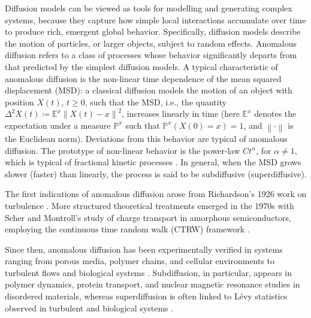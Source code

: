\documentclass[reqno]{amsart}
\theoremstyle{remark}
\numberwithin{equation}{section} %
\newcommand{\PP}{\mathds{P}}
\newcommand{\1}{\mathds{1}}
\begin{document}
	Diffusion models can be viewed as tools for modelling and generating complex systems, because they capture how simple local interactions accumulate over time to produce rich, emergent global behavior. Specifically, diffusion models describe the motion of particles, or larger objects, subject to random effects. Anomalous diffusion refers to a class of processes whose behavior significantly departs from that predicted by the simplest diffusion models. A typical characteristic of anomalous diffusion is the non-linear time dependence of the mean squared displacement (MSD): a classical diffusion models the motion of an object with position $X(t)$, $t \geq 0$, such that the MSD, i.e., the quantity $\Delta^2X(t) \coloneqq \mathds{E}^x\left\| X(t)-x \right\|^2$, increases linearly in time (here $\mathds{E}^x$ denotes the expectation under a measure $\PP^x$ such that $\PP^x(X(0)=x)=1$, and $\left\| \cdot \right\|$ is the Euclidean norm). Deviations from this behavior are typical of anomalous diffusion. The prototype of non-linear behavior is the power-law $Ct^\alpha$, for $\alpha \neq 1$, which is typical of fractional kinetic processes \cite{metzler2000}. In general, when the MSD grows slower (faster) than linearly, the process is said to be subdiffusive (superdiffusive).	
	
	
	The first indications of anomalous diffusion arose from Richardson’s 1926 work on turbulence \cite{richardson1926}. More structured theoretical treatments emerged in the 1970s with Scher and Montroll’s study of charge transport in amorphous semiconductors, employing the continuous time random walk (CTRW) framework \cite{scher1975}.
	
	Since then, anomalous diffusion has been experimentally verified in systems ranging from porous media, polymer chains, and cellular environments to turbulent flows and biological systems \cite{barkai0, barkai2000, golding2006, sokolov2005}. Subdiffusion, in particular, appears in polymer dynamics, protein transport, and {nuclear magnetic resonance } studies in disordered materials, whereas superdiffusion is often linked to Lévy statistics observed in turbulent and biological systems \cite{zumofen1993, bouchaud1990, weiss1994}.
	
\end{document}
